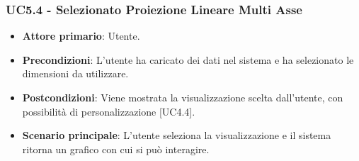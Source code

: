 \subsubsection{UC5.4 - Selezionato Proiezione Lineare Multi Asse}

\begin{itemize}
	\item \textbf{Attore primario}: Utente.
	\item \textbf{Precondizioni}: L'utente ha caricato dei dati nel sistema e ha selezionato le dimensioni da utilizzare.
	\item \textbf{Postcondizioni}: Viene mostrata la visualizzazione  scelta dall'utente, con possibilità di personalizzazione [UC4.4].
	\item \textbf{Scenario principale}: L'utente seleziona la visualizzazione  e il sistema ritorna un grafico con cui si può interagire.
\end{itemize}